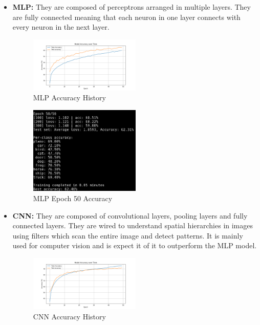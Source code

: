 \begin{itemize}
    \item \textbf{MLP:} They are composed of perceptrons arranged in multiple layers. They are
    fully connected meaning that each neuron in one layer connects with every neuron in the next
    layer. 
    \begin{figure}[H]
        \centering
        \includegraphics[width=0.5\textwidth]{media/cifar10_mlp_accuracy.png}
        \caption{MLP Accuracy History}
    \end{figure}
    \begin{figure}[H]
        \centering
        \includegraphics[width=0.5\textwidth]{media/mlp_epoch_50.png}
        \caption{MLP Epoch 50 Accuracy}
    \end{figure}
    \item \textbf{CNN:} They are composed of convolutional layers, pooling layers and fully connected
    layers. They are wired to understand spatial hierarchies in images using filters which scan the 
    entire image and detect patterns. It is mainly used for computer vision and is expect it of it
    to outperform the MLP model.
    \begin{figure}[H]
        \centering
        \includegraphics[width=0.5\textwidth]{media/cifar10_cnn_accuracy.png}
        \caption{CNN Accuracy History}

\end{figure}
\end{itemize}
